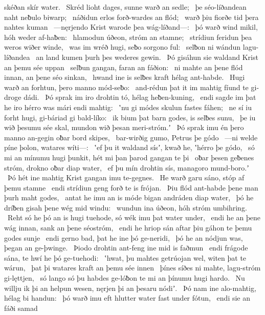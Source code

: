 skéðan skír water. \hld\ Skréd lioht dages,
sunne warð an sedle; \hld\ þe séo-líðandean
naht neƀulo biwarp; \hld\ náðidun erlos
forð-wardes an flód; \hld\ warð þiu fiorðe tid
þera nahtes kuman \hld\ —nęrjendo Krist
warode þea wág-líðand—: \hld\ þó warð wind mikil,
hóh weder af-haƀen: \hld\ hlamodun úðeon,
stróm an stamne; \hld\ strídiun feridun
þea weros wiðer winde, \hld\ was im wréð hugi,
seƀo sorgono ful: \hld\ selƀon ni wándun
lagu-líðandea \hld\ an land kumen
þurh þes wederes gewin. \hld\ Þó gisáhun sie waldand Krist
an þemu sée uppan \hld\ selƀun gangan,
faran an fáðion: \hld\ ni mahte an þene flód innan,
an þene séo sinkan, \hld\ hwand ine is selƀes kraft
hélag ant-habde. \hld\ Hugi warð an forhtun,
þero manno mód-seƀo: \hld\ and-rédun þat it im mahtig fíund
te gi-droge dádi. \hld\ Þó sprak im iro drohtin tó,
hélag heƀen-kuning, \hld\ endi sagde im þat he iro hérro was
mári endi mahtig: \hld\ ʽnu gi módes skulun
fastes fáhen; \hld\ ne sí iu forht hugi,
gi-báriad gi bald-líko: \hld\ ik bium þat barn godes,
is selƀes sunu, \hld\ þe iu wið þesumu sée skal,
mundon wið þesan meri-stróm.ʼ \hld\ Þó sprak imu én þero manno an-gegin
oƀar bord skipes, \hld\ bar-wirðig gumo,
Petrus þe gódo \hld\ —ni welde píne þolon,
watares wíti—: \hld\ ʽef þu it waldand sísʼ, kwað he,
ʽhérro þe gódo, \hld\ só mi an mínumu hugi þunkit,
hét mi þan þarod gangan te þi \hld\ oƀar þesen geƀenes stróm,
drokno oƀar diap water, \hld\ ef þu mín drohtin sís,
managoro mund-boro.ʼ \hld\ Þó hét ine mahtig Krist
gangan imu te-gegnes. \hld\ He warð garu sáno,
stóp af þemu stamne \hld\ endi strídiun geng
forð te is frójan. \hld\ Þiu flód ant-habde
þene man þurh maht godes, \hld\ antat he imu an is móde bigan
andráden diap water, \hld\ þó he dríƀen gisah
þene wég mid windu: \hld\ wundun ina úðeon,
hóh stróm umbihring. \hld\ Reht só he þó an is hugi tuehode,
só wék imu þat water under, \hld\ endi he an þene wág innan,
sank an þene séostróm, \hld\ endi he hriop sán aftar þiu
gáhon te þemu godes sunje \hld\ endi gerno bad,
þat he ine þó ge-neridi, \hld\ þó he an nódjun was,
þegan an ge-þwinge. \hld\ Þiodo drohtin
ant-feng ine mid is faðmun \hld\ endi frágode sána,
te hwí he þó ge-tuehodi: \hld\ ʽhwat, þu mahtes getrúojan wel,
witen þat te wárun, \hld\ þat þi watares kraft
an þemu sée innen \hld\ þínes síðes ni mahte,
lagu-stróm gi-lęttjen, \hld\ só lango só þu habdes ge-lóƀon te mi
an þínumu hugi hardo. \hld\ Nu willju ik þi an helpun wesen,
nęrjen þi an þesaru nódiʼ. \hld\ Þó nam ine alo-mahtig,
hélag bi handun: \hld\ þó warð imu eft hlutter water
fast under fótun, \hld\ endi sie an fáði samad
